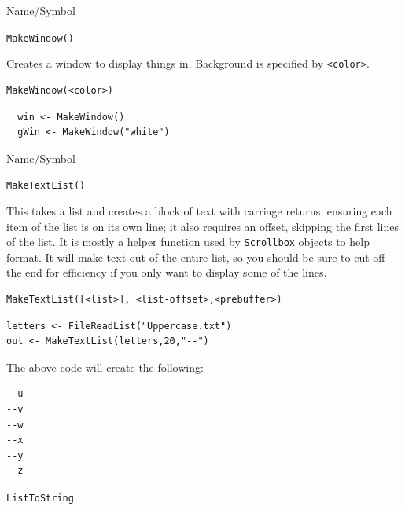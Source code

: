 \begin{desc}{Name/Symbol}
\item[Name/Symbol]	\verb+MakeWindow()+ 

\item[Description]	Creates a window to display things in.
		Background is specified by \verb+<color>+.

\item[Usage]		
\begin{verbatim}
MakeWindow(<color>)
\end{verbatim}

\item[Example]
\begin{verbatim}	
  win <- MakeWindow()
  gWin <- MakeWindow("white")
\end{verbatim}
    
\item[See Also]	
\end{desc}




\begin{desc}{Name/Symbol}
\item[Name/Symbol]	\verb+MakeTextList()+ 

\item[Description]	This takes a list and creates a block of text with carriage returns, ensuring each item of the list is on its own line; it also requires an offset, skipping the first lines of the list.  It is mostly a helper function used by \verb+Scrollbox+ objects to help format.  It will make text out of the entire list, so  you should be sure to cut off the end for efficiency if you only want to display some of the lines.


\item[Usage]		
\begin{verbatim}
MakeTextList([<list>], <list-offset>,<prebuffer>)
\end{verbatim}

\item[Example]
\begin{verbatim}	
letters <- FileReadList("Uppercase.txt")
out <- MakeTextList(letters,20,"--")
\end{verbatim}
The above code will create the following:
\begin{verbatim}
--u
--v
--w
--x
--y
--z
\end{verbatim}
    
\item[See Also]	
\verb+ListToString+
\end{desc}

